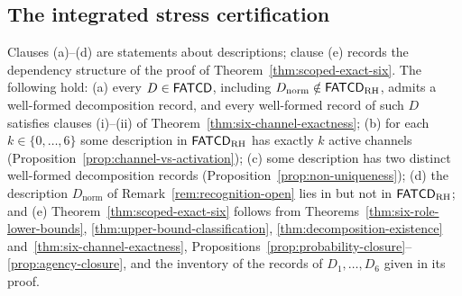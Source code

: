 \subsection{The integrated stress certification}\label{subsec:integrated-stress-theorem}

\begin{proposition}\label{thm:integrated-stress}
Clauses (a)--(d) are statements about descriptions; clause (e) records the
dependency structure of the proof of Theorem~\ref{thm:scoped-exact-six}.
The following hold:
(a) every \(D\in\mathsf{FATCD}{}\), including \(D_{\mathrm{norm}}\notin\mathsf{FATCD}_{\mathrm{RH}}\),
admits a well-formed decomposition record, and every well-formed record of such
\(D\) satisfies clauses (i)--(ii) of Theorem~\ref{thm:six-channel-exactness};
(b) for each \(k\in\{0,\dots,6\}\) some description in \(\mathsf{FATCD}_{\mathrm{RH}}\) has exactly
\(k\) active channels (Proposition~\ref{prop:channel-vs-activation});
(c) some description has two distinct well-formed decomposition records
(Proposition~\ref{prop:non-uniqueness});
(d) the description \(D_{\mathrm{norm}}\) of Remark~\ref{rem:recognition-open}
lies in \FATCD{} but not in \(\mathsf{FATCD}_{\mathrm{RH}}\); and
(e) Theorem~\ref{thm:scoped-exact-six} follows from
Theorems~\ref{thm:six-role-lower-bounds},
\ref{thm:upper-bound-classification}, \ref{thm:decomposition-existence}
and~\ref{thm:six-channel-exactness}, Propositions~\ref{prop:probability-closure}--\ref{prop:agency-closure},
and the inventory of the records of \(D_1,\ldots,D_6\) given in its proof.
\end{proposition}

